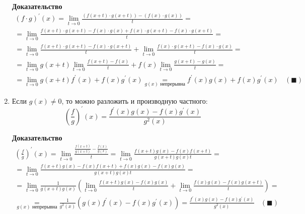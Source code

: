 \documentclass[class=article,a4paper,12pt,crop=false]{standalone}
\begin{document}
\begin{enumerate}
{        \textbf{Доказательство}
        \begin{multline}
            (f\cdot{g})^{'}(x) = \lim\limits_{t \rightarrow 0}\frac{
                (f(x + t)\cdot{g(x + t)}) - (f(x)\cdot{g(x)})
            }{t} = \\ = 
            \lim\limits_{t \rightarrow 0}\frac{
                f(x + t)\cdot{g(x + t)} - f(x)\cdot{g(x)} + f(x)\cdot{g(x + t)} - f(x)\cdot{g(x + t)}
            }{t} = \\ =
            \lim\limits_{t \rightarrow 0}\frac{
                f(x + t)\cdot{g(x + t)} - f(x)\cdot{g(x + t)}
            }{t} + \lim\limits_{t \rightarrow 0}\frac{
                f(x)\cdot{g(x + t)} - f(x)\cdot{g(x)} 
            }{t} = \\ =
            \lim\limits_{t \rightarrow 0}g(x + t)\lim\limits_{t \rightarrow 0}\frac{f(x + t) - f(x)}{t} +
            f(x)\lim\limits_{t \rightarrow 0}\frac{g(x + t) - g(x)}{t} = \\
            = \lim\limits_{t \rightarrow 0}g(x + t)f^{'}(x) + f(x)g^{'}(x) \underset{g(x)\text{ непрерывна}}{=}
            f^{'}(x)g(x) + f(x)g^{'}(x) \:\:\:\: (\blacksquare)
        \end{multline}
    }
    \item {
        Если $g(x) \neq 0$, то можно разложить и производную частного:
        \begin{equation}
            \left(\frac{f}{g}\right)^{'}(x) = \frac{f^{'}(x)g(x) - f(x)g^{'}(x)}{g^2(x)}
        \end{equation}

        \textbf{Доказательство}
        \begin{multline}
            \left(\frac{f}{g}\right)^{'}(x) = \lim\limits_{t \rightarrow 0}\frac{\frac{f(x + t)}{g(x + t)} - \frac{f(x)}{g(x)}}{t} =
            \lim\limits_{t \rightarrow 0}\frac{f(x + t)g(x) - f(x)f(x + t)}{g(x + t)g(x)t} = \\ =
            \lim\limits_{t \rightarrow 0}\frac{f(x + t)g(x) - f(x)f(x + t) + f(x)g(x) - f(x)g(x)}{g(x + t)g(x)t} =\\ =
            \lim\limits_{t \rightarrow 0}\frac{1}{g(x + t)g(x)}\left(\lim\limits_{t \rightarrow 0}\frac{f(x + t)g(x) - f(x)g(x)}{t} 
            + \lim\limits_{t \rightarrow 0}\frac{f(x)g(x) - f(x)g(x + t)}{t}\right) = \\
            \underset{g(x)\text{ непрерывна}}{=} \frac{1}{g^2(x)}\left(g(x)f^{'}(x) - f(x)g^{'}(x)\right) =
            \frac{f^{'}(x)g(x) - f(x)g^{'}(x)}{g^2(x)} \:\:\:\: (\blacksquare)
        \end{multline}
    }
\end{enumerate}
\end{document}
